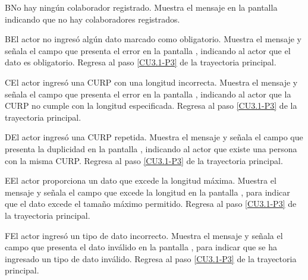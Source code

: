 
		\begin{UCtrayectoriaA}{B}{No hay ningún colaborador registrado.}
	\UCpaso[\UCsist] Muestra el mensaje  en la pantalla  indicando que no hay colaboradores registrados.
		\end{UCtrayectoriaA}

	\begin{UCtrayectoriaA}{B}{El actor no ingresó algún dato marcado como obligatorio.}
		\UCpaso[\UCsist] Muestra el mensaje  y señala el campo que presenta el error en la pantalla , indicando al actor que el dato es obligatorio.
		\UCpaso Regresa al paso \ref{CU3.1-P3} de la trayectoria principal.
	\end{UCtrayectoriaA}

	\begin{UCtrayectoriaA}{C}{El actor ingresó una CURP con una longitud incorrecta.}
		\UCpaso[\UCsist] Muestra el mensaje  y señala el campo que presenta el error en la pantalla , indicando al actor que la CURP no cumple con la longitud especificada.
		\UCpaso Regresa al paso \ref{CU3.1-P3} de la trayectoria principal.
	\end{UCtrayectoriaA}
	
	\begin{UCtrayectoriaA}{D}{El actor ingresó una CURP repetida.}
		\UCpaso[\UCsist] Muestra el mensaje  y señala el campo que presenta la duplicidad en la pantalla , indicando al actor que existe una persona con la misma CURP.
		\UCpaso Regresa al paso \ref{CU3.1-P3} de la trayectoria principal.
	\end{UCtrayectoriaA}

	\begin{UCtrayectoriaA}{E}{El actor proporciona un dato que excede la longitud máxima.}
		\UCpaso[\UCsist] Muestra el mensaje  y señala el campo que excede la longitud en la pantalla , para indicar que el dato excede el tamaño máximo permitido.
		\UCpaso Regresa al paso \ref{CU3.1-P3} de la trayectoria principal.
	\end{UCtrayectoriaA}

	\begin{UCtrayectoriaA}{F}{El actor ingresó un tipo de dato incorrecto.}
		\UCpaso[\UCsist] Muestra el mensaje  y señala el campo que presenta el dato inválido en la pantalla , para indicar que se ha ingresado un tipo de dato inválido.
		\UCpaso Regresa al paso \ref{CU3.1-P3} de la trayectoria principal.
	\end{UCtrayectoriaA}

